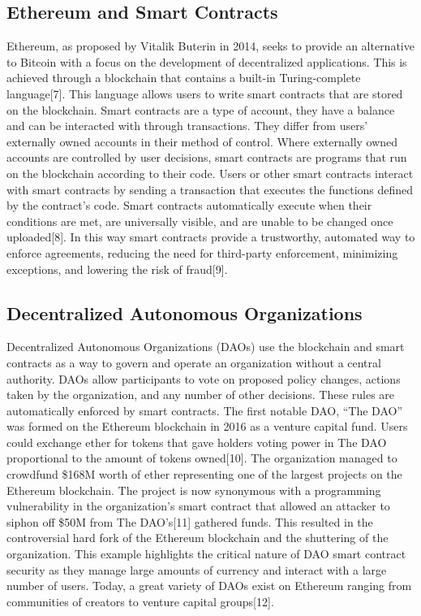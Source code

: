 \documentclass[conference]{IEEEtran}
\begin{document}
\subsection{Ethereum and Smart Contracts}
Ethereum, as proposed by Vitalik Buterin in 2014, seeks to provide an alternative to Bitcoin with a focus on the development of decentralized applications. This is achieved through a blockchain that contains a built-in Turing-complete language[7]. This language allows users to write smart contracts that are stored on the blockchain. Smart contracts are a type of account, they have a balance and can be interacted with through transactions. They differ from users’ externally owned accounts in their method of control. Where externally owned accounts are controlled by user decisions, smart contracts are programs that run on the blockchain according to their code. Users or other smart contracts interact with smart contracts by sending a transaction that executes the functions defined by the contract’s code. Smart contracts automatically execute when their conditions are met, are universally visible, and are unable to be changed once uploaded[8]. In this way smart contracts provide a trustworthy, automated way to enforce agreements, reducing the need for third-party enforcement, minimizing exceptions, and lowering the risk of fraud[9].

\subsection{Decentralized Autonomous Organizations}
Decentralized Autonomous Organizations (DAOs) use the blockchain and smart contracts as a way to govern and operate an organization without a central authority. DAOs allow participants to vote on proposed policy changes, actions taken by the organization, and any number of other decisions. These rules are automatically enforced by smart contracts. The first notable DAO, “The DAO” was formed on the Ethereum blockchain in 2016 as a venture capital fund. Users could exchange ether for tokens that gave holders voting power in The DAO proportional to the amount of tokens owned[10]. The organization managed to crowdfund \$168M worth of ether representing one of the largest projects on the Ethereum blockchain. The project is now synonymous with a programming vulnerability in the organization's smart contract that allowed an attacker to siphon off \$50M from The DAO’s[11] gathered funds. This resulted in the controversial hard fork of the Ethereum blockchain and the shuttering of the organization. This example highlights the critical nature of DAO smart contract security as they manage large amounts of currency and interact with a large number of users. Today, a great variety of DAOs exist on Ethereum ranging from communities of creators to venture capital groups[12].
\end{document}
